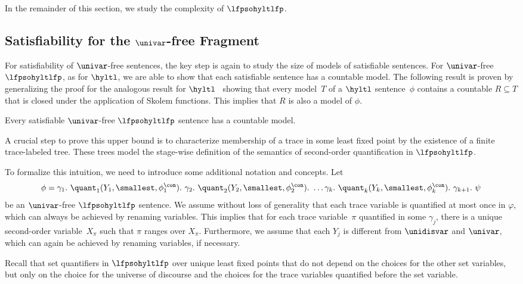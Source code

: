 In the remainder of this section, we study the complexity of $\lfpsohyltlfp$. 

\subsection{\texorpdfstring{Satisfiability for the \boldmath$\univar$-free Fragment}{Satisfiability for the Xa-free Fragment}}
\label{subsec_lfpsatcw}
For satisfiability of $\univar$-free sentences, the key step is again to study the size of models of satisfiable sentences. 
For $\univar$-free $\lfpsohyltlfp$, as for $\hyltl$, we are able to show that each satisfiable sentence has a countable model.
The following result is proven by generalizing the proof for the analogous result for $\hyltl$~\cite{FZ17} showing that every model~$T$ of a $\hyltl$ sentence~$\phi$ contains a countable $R\subseteq T$ that is closed under the application of Skolem functions. This implies that $R$ is also a model of $\phi$.

\begin{lem}
\label{lemma_lfpcwmodelsize}
Every satisfiable $\univar$-free $\lfpsohyltlfp$ sentence has a countable model.
\end{lem}

A crucial step to prove this upper bound is to characterize membership of a trace in some least fixed point by the existence of a finite trace-labeled tree. These trees model the stage-wise definition of the semantics of second-order quantification in $\lfpsohyltlfp$.

To formalize this intuition, we need to introduce some additional notation and concepts. 
Let \[
\phi = 
\gamma_1.\ \quant_1(Y_1, \smallest, \phi_1^\con).\ 
\gamma_2.\ \quant_2(Y_2, \smallest, \phi_2^\con).\ 
\ldots 
\gamma_k.\ \quant_k(Y_k, \smallest, \phi_k^\con).\
\gamma_{k+1}.\
\psi
\]
be an $\univar$-free $\lfpsohyltlfp$ sentence.
We assume without loss of generality that each trace variable is quantified at most once in $\varphi$, which can always be achieved by renaming variables. This implies that for each trace variable~$\pi$ quantified in some $\gamma_j$, there is a unique second-order variable~$X_\pi$ such that $\pi$ ranges over $X_\pi$.
Furthermore, we assume that each $Y_j$ is different from $\unidisvar$ and $\univar$, which can again be achieved by renaming variables, if necessary.

Recall that set quantifiers in $\lfpsohyltlfp$  over unique least fixed points that do not depend on the choices for the other set variables, but only on the choice for the universe of discourse and the choices for the trace variables quantified before the set variable.


